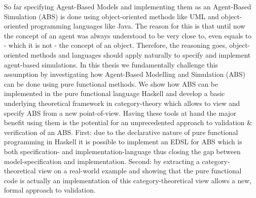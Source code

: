\documentclass[oneside]{book}
\begin{document}
So far specifying Agent-Based Models and implementing them as an Agent-Based Simulation (ABS) is done using object-oriented methods like UML and object-oriented  programming languages like Java. The reason for this is that until now the concept of an agent was always understood to be very close to, even equals to - which it is not - the concept of an object. Therefore, the reasoning goes, object-oriented methods and languages should apply naturally to specify and implement agent-based simulations. In this thesis we fundamentally challenge this assumption by investigating how Agent-Based Modelling and Simulation (ABS) can be done using pure functional methods. 
We show how ABS can be implemented in the pure functional language Haskell and develop a basic underlying theoretical framework in category-theory which allows to view and specify ABS from a new point-of-view. Having these tools at hand the major benefit using them is the potential for an unprecedented approach to validation \& verification of an ABS. First: due to the declarative nature of pure functional programming in Haskell it is possible to implement an EDSL for ABS which is both specification- and implementation-language thus closing the gap between model-specification and implementation. Second: by extracting a category-theoretical view on a real-world example and showing that the pure functional code is actually an implementation of this category-theoretical view allows a new, formal approach to validation.

\clearpage
\tableofcontents
\clearpage



















\end{document}
